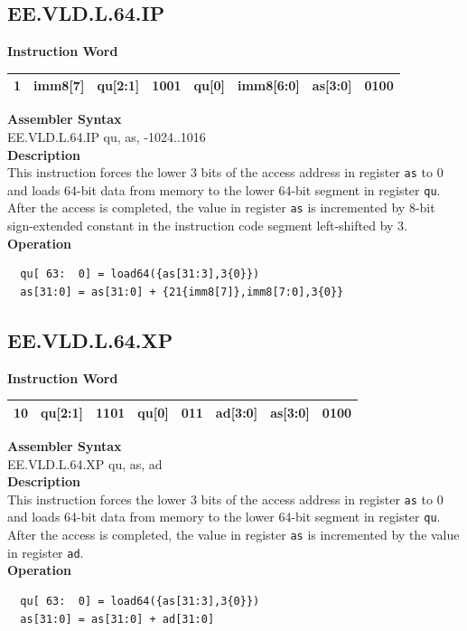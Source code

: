 \clearpage
\subsection{EE.VLD.L.64.IP}\label{instruction:EEVLDL64IP}
\setlength\tabcolsep{6pt}
\textbf{Instruction Word} \\
\begin{tabular}{|c|c|c|c|c|c|c|c|}
	\hline
	1 & imm8[7] & qu[2:1] & 1001 & qu[0] & imm8[6:0] & as[3:0] & 0100 \\
	\hline
\end{tabular}

\textbf{Assembler Syntax} \\
EE.VLD.L.64.IP qu, as, -1024..1016 \\
\textbf{Description} \\
This instruction forces the lower 3 bits of the access address in register \lstinline{as} to 0 and loads 64-bit data from memory to the lower 64-bit segment in register \lstinline{qu}. After the access is completed, the value in register \lstinline{as} is incremented by 8-bit sign-extended constant in the instruction code segment left-shifted by 3.\\
\textbf{Operation}
\begin{lstlisting}
  qu[ 63:  0] = load64({as[31:3],3{0}})
  as[31:0] = as[31:0] + {21{imm8[7]},imm8[7:0],3{0}}
\end{lstlisting}

\clearpage
\subsection{EE.VLD.L.64.XP}\label{instruction:EEVLDL64XP}
\setlength\tabcolsep{6pt}
\textbf{Instruction Word} \\
\begin{tabular}{|c|c|c|c|c|c|c|c|}
	\hline
	10 & qu[2:1] & 1101 & qu[0] & 011 & ad[3:0] & as[3:0] & 0100 \\
	\hline
\end{tabular}

\textbf{Assembler Syntax} \\
EE.VLD.L.64.XP qu, as, ad \\
\textbf{Description} \\
This instruction forces the lower 3 bits of the access address in register \lstinline{as} to 0 and loads 64-bit data from memory to the lower 64-bit segment in register \lstinline{qu}. After the access is completed, the value in register \lstinline{as} is incremented by the value in register \lstinline{ad}.\\
\textbf{Operation}
\begin{lstlisting}
  qu[ 63:  0] = load64({as[31:3],3{0}})
  as[31:0] = as[31:0] + ad[31:0]
\end{lstlisting}

